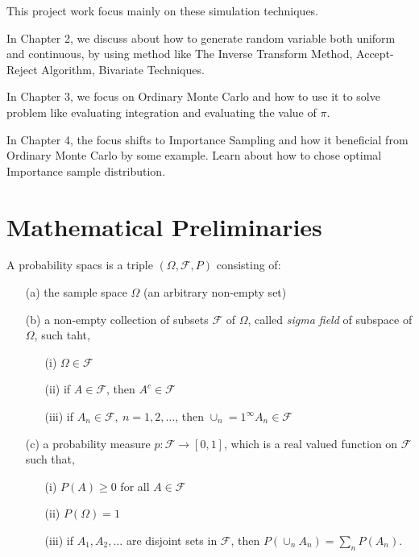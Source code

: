 This project work focus mainly on these simulation techniques.

In Chapter 2, we discuss about how to generate random variable both
uniform and continuous, by using method like The Inverse Transform Method, 
Accept-Reject Algorithm, Bivariate Techniques.

In Chapter 3, we focus on Ordinary Monte Carlo and how to use it to solve problem like evaluating integration and evaluating the value of $\pi$.

In Chapter 4, the focus shifts to Importance Sampling and how it beneficial
from Ordinary Monte Carlo by some example. Learn about how to chose 
optimal Importance sample distribution.

\section{Mathematical Preliminaries}

\begin{definition}
	A probability spacs is a triple $(\Omega, \mathcal{F}, P)$ consisting of:
	\begin{enumerate}
		\item[(a)] the sample space $\Omega$ (an arbitrary non-empty set)
		\item[(b)] a non-empty collection of subsets $\mathcal{F} $ of $ \Omega $,
		      called \textit{sigma field} of subspace of $ \Omega $, 
		      such taht,
		      \begin{itemize}
			      \item[(i)] $ \Omega \in \mathcal{F} $
			      \item[(ii)] if $ A \in \mathcal{F} $, then $ A^{c}\in \mathcal{F}  $
			      \item [(iii)] if $ A_n\in \mathcal{F},\ n=1,2,\ldots $, then $ \cup_n=1^{\infty}A_n \in \mathcal{F}  $
		      \end{itemize}
		\item [(c)] a probability measure $ p:\mathcal{F}\to [0,1] $, which is a real valued function on $ \mathcal{F} $
		      such that,
		      \begin{itemize}
			      \item [(i)] $ P(A) \ge 0 $ for all $ A\in \mathcal{F} $
			      \item [(ii)] $ P(\Omega) = 1 $
			      \item [(iii)] if $ A_1,A_2,\ldots $ are disjoint sets in $ \mathcal{F} $, then $ P(\cup_n A_n) = \sum_{n} P(A_n)  $.
		      \end{itemize}
	\end{enumerate}
\end{definition}

